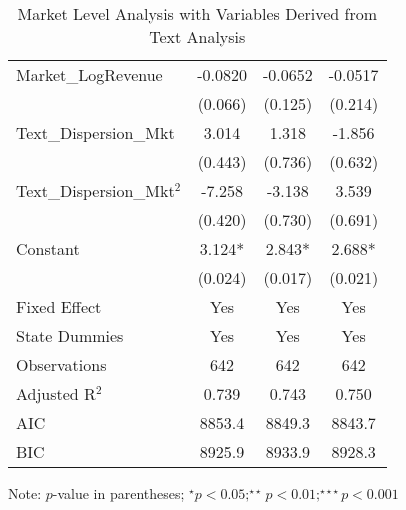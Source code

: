 \begin{table}
\begin{threeparttable}
\begin{tabular}{@{}lccc@{}}
Market\_LogRevenue                           & -0.0820               & -0.0652               & -0.0517               \\
                                             & (0.066)               & (0.125)               & (0.214)               \\
Text\_Dispersion\_Mkt                        & 3.014                 & 1.318                 & -1.856                \\
                                             & (0.443)               & (0.736)               & (0.632)               \\
Text\_Dispersion\_Mkt$^2$                    & -7.258                & -3.138                & 3.539                 \\
                                             & (0.420)               & (0.730)               & (0.691)               \\
Constant                                     & 3.124*                & 2.843*                & 2.688*                \\
                                             & (0.024)               & (0.017)               & (0.021)               \\
Fixed Effect                                   & Yes            & Yes            & Yes            \\
State Dummies                                  & Yes            & Yes            & Yes            \\
Observations                                 & 642          & 642          & 642                  \\
Adjusted R$^2$                               & 0.739                 & 0.743                 & 0.750                 \\
AIC                                            & 8853.4         & 8849.3         & 8843.7         \\
BIC                                            & 8925.9         & 8933.9         & 8928.3         \\ \bottomrule
\end{tabular}%
\begin{tablenotes}
\item Note: $p$-value in parentheses; $^\star p<0.05;^{\star\star} p<0.01;^{\star\star\star} p<0.001$
\end{tablenotes}
\end{threeparttable}
\caption{Market Level Analysis with Variables Derived from Text Analysis}
\label{reg_mkt_textbased}
\end{table} 
